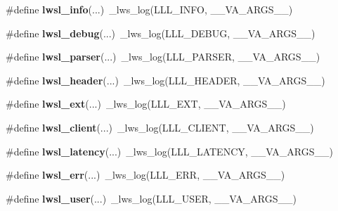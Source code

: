 \begin{DoxyCompactItemize}
\#define {\bfseries lwsl\+\_\+info}(...)~\+\_\+lws\+\_\+log(L\+L\+L\+\_\+\+I\+N\+FO, \+\_\+\+\_\+\+V\+A\+\_\+\+A\+R\+G\+S\+\_\+\+\_\+)
\item 
\mbox{\label{group__log_ga74a1a3d4d96b146a0ac45faab0028ade}} 
\#define {\bfseries lwsl\+\_\+debug}(...)~\+\_\+lws\+\_\+log(L\+L\+L\+\_\+\+D\+E\+B\+UG, \+\_\+\+\_\+\+V\+A\+\_\+\+A\+R\+G\+S\+\_\+\+\_\+)
\item 
\mbox{\label{group__log_gaee051a14945bec746ed3b527f384dc72}} 
\#define {\bfseries lwsl\+\_\+parser}(...)~\+\_\+lws\+\_\+log(L\+L\+L\+\_\+\+P\+A\+R\+S\+ER, \+\_\+\+\_\+\+V\+A\+\_\+\+A\+R\+G\+S\+\_\+\+\_\+)
\item 
\mbox{\label{group__log_gaab72aa186eff075fb3d229cb99a35434}} 
\#define {\bfseries lwsl\+\_\+header}(...)~\+\_\+lws\+\_\+log(L\+L\+L\+\_\+\+H\+E\+A\+D\+ER, \+\_\+\+\_\+\+V\+A\+\_\+\+A\+R\+G\+S\+\_\+\+\_\+)
\item 
\mbox{\label{group__log_ga8e0877b452d80bc154793ad81bfce742}} 
\#define {\bfseries lwsl\+\_\+ext}(...)~\+\_\+lws\+\_\+log(L\+L\+L\+\_\+\+E\+XT, \+\_\+\+\_\+\+V\+A\+\_\+\+A\+R\+G\+S\+\_\+\+\_\+)
\item 
\mbox{\label{group__log_ga181ea1ed9ba604e493ce092850d9da90}} 
\#define {\bfseries lwsl\+\_\+client}(...)~\+\_\+lws\+\_\+log(L\+L\+L\+\_\+\+C\+L\+I\+E\+NT, \+\_\+\+\_\+\+V\+A\+\_\+\+A\+R\+G\+S\+\_\+\+\_\+)
\item 
\mbox{\label{group__log_gab5842ee4ec5f763d057869e083ff1cb0}} 
\#define {\bfseries lwsl\+\_\+latency}(...)~\+\_\+lws\+\_\+log(L\+L\+L\+\_\+\+L\+A\+T\+E\+N\+CY, \+\_\+\+\_\+\+V\+A\+\_\+\+A\+R\+G\+S\+\_\+\+\_\+)
\item 
\mbox{\label{group__log_gad44c15d00076052a398244035a7dbb56}} 
\#define {\bfseries lwsl\+\_\+err}(...)~\+\_\+lws\+\_\+log(L\+L\+L\+\_\+\+E\+RR, \+\_\+\+\_\+\+V\+A\+\_\+\+A\+R\+G\+S\+\_\+\+\_\+)
\item 
\mbox{\label{group__log_ga9aad07786eb4b3189b0eac919b2a960f}} 
\#define {\bfseries lwsl\+\_\+user}(...)~\+\_\+lws\+\_\+log(L\+L\+L\+\_\+\+U\+S\+ER, \+\_\+\+\_\+\+V\+A\+\_\+\+A\+R\+G\+S\+\_\+\+\_\+)
\item 

\end{DoxyCompactItemize}
